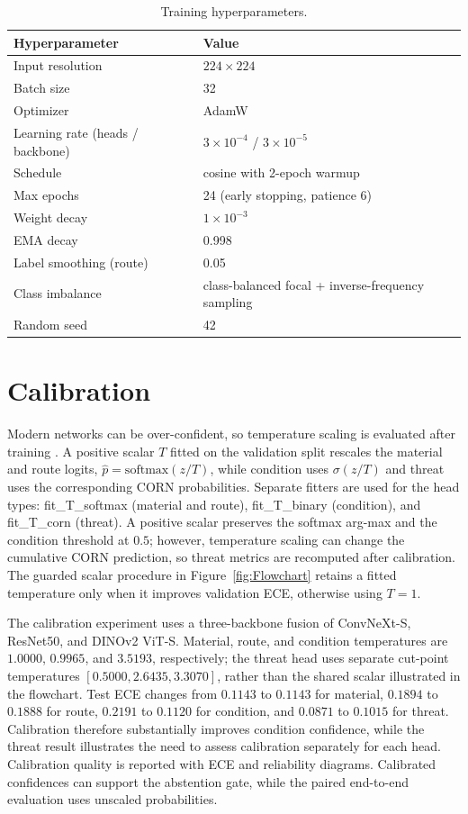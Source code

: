 \begin{table}[!ht]
\centering
\caption{Training hyperparameters.}
\label{tab:hyper}
\begin{tabularx}{0.92\linewidth}{@{}l Y@{}}
\toprule
\textbf{Hyperparameter} & \textbf{Value} \\
\midrule
Input resolution & $224 \times 224$ \\
Batch size & 32 \\
Optimizer & AdamW \\
Learning rate (heads / backbone) & $3\times10^{-4}$ / $3\times10^{-5}$ \\
Schedule & cosine with 2-epoch warmup \\
Max epochs & 24 (early stopping, patience 6) \\
Weight decay & $1\times10^{-3}$ \\
EMA decay & 0.998 \\
Label smoothing (route) & 0.05 \\
Class imbalance & class-balanced focal + inverse-frequency sampling \\
Random seed & 42 \\
\bottomrule
\end{tabularx}
\end{table}

\section{Calibration}
Modern networks can be over-confident, so temperature scaling is evaluated after training \cite{guo2017}. A positive scalar $T$ fitted on the validation split rescales the material and route logits, $\hat{p}=\mathrm{softmax}(z/T)$, while condition uses $\sigma(z/T)$ and threat uses the corresponding CORN probabilities. Separate fitters are used for the head types: fit\_T\_softmax (material and route), fit\_T\_binary (condition), and fit\_T\_corn (threat). A positive scalar preserves the softmax arg-max and the condition threshold at $0.5$; however, temperature scaling can change the cumulative CORN prediction, so threat metrics are recomputed after calibration. The guarded scalar procedure in Figure~\ref{fig:Flowchart} retains a fitted temperature only when it improves validation ECE, otherwise using $T=1$.

The calibration experiment uses a three-backbone fusion of ConvNeXt-S, ResNet50, and DINOv2 ViT-S. Material, route, and condition temperatures are $1.0000$, $0.9965$, and $3.5193$, respectively; the threat head uses separate cut-point temperatures $[0.5000,2.6435,3.3070]$, rather than the shared scalar illustrated in the flowchart. Test ECE changes from $0.1143$ to $0.1143$ for material, $0.1894$ to $0.1888$ for route, $0.2191$ to $0.1120$ for condition, and $0.0871$ to $0.1015$ for threat. Calibration therefore substantially improves condition confidence, while the threat result illustrates the need to assess calibration separately for each head. Calibration quality is reported with ECE and reliability diagrams. Calibrated confidences can support the abstention gate, while the paired end-to-end evaluation uses unscaled probabilities.

